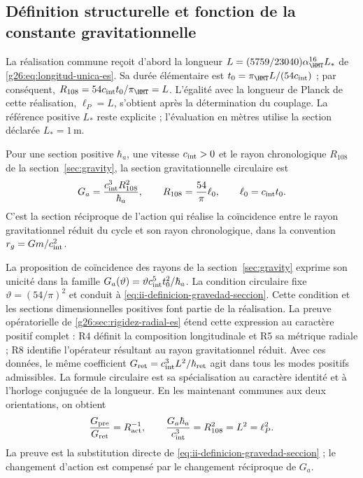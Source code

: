\subsection{Définition structurelle et fonction de la constante gravitationnelle}
\label{sec:ii-definicion-gravedad}

La réalisation commune reçoit d’abord la longueur
\(L=(5759/23040)\alpha_{\HMT}^{16}L_*\) de
\eqref{g26:eq:longitud-unica-es}. Sa durée élémentaire est
\(t_0=\pi_{\HMT}L/(54c_{\rm int})\) ; par conséquent,
\(R_{108}=54c_{\rm int}t_0/\pi_{\HMT}=L\).
L’égalité avec la longueur de Planck de cette réalisation,
\(\ell_P=L\), s’obtient après la détermination du couplage.
La référence positive \(L_*\) reste explicite ; l’évaluation
en mètres utilise la section déclarée \(L_*=1\,\mathrm m\).

\begin{definition}
Pour une section positive \(\hbar_a\), une vitesse
\(c_{\rm int}>0\) et le rayon chronologique \(R_{108}\) de la
section~\ref{sec:gravity}, la section gravitationnelle circulaire est
\begin{equation}
 G_a=\frac{c_{\rm int}^{3}R_{108}^{2}}{\hbar_a},
 \qquad R_{108}=\frac{54}{\pi}\ell_0,
 \qquad \ell_0=c_{\rm int}t_0.
 \label{eq:ii-definicion-gravedad-seccion}
\end{equation}
C'est la section réciproque de l'action qui réalise la coïncidence
entre le rayon gravitationnel réduit du cycle et son rayon
chronologique, dans la convention \(r_g=Gm/c_{\rm int}^2\).
\end{definition}

La proposition de coïncidence des rayons de la
section~\ref{sec:gravity} exprime son unicité dans la famille
\(G_a(\vartheta)=\vartheta c_{\rm int}^{5}t_0^2/\hbar_a\).
La condition circulaire fixe \(\vartheta=(54/\pi)^2\) et conduit
à \eqref{eq:ii-definicion-gravedad-seccion}. Cette condition et les
sections dimensionnelles positives font partie de la réalisation.
La preuve opératorielle de \ref{g26:sec:rigidez-radial-es} étend cette
expression au caractère positif complet : R4 définit la composition
longitudinale et R5 sa métrique radiale ; R8 identifie l’opérateur résultant
au rayon gravitationnel réduit. Avec ces données, le même coefficient
\(G_{\rm ret}=c_{\rm int}^3L^2/\hbar_{\rm ret}\) agit dans tous
les modes positifs admissibles. La formule circulaire est sa spécialisation
au caractère identité et à l’horloge conjuguée de la longueur.
En les maintenant communes aux deux orientations, on obtient
\begin{equation}
 \frac{G_{\mathrm{pre}}}{G_{\mathrm{ret}}}
 =R_{\mathrm{act}}^{-1},
 \qquad
 \frac{G_a\hbar_a}{c_{\rm int}^{3}}
 =R_{108}^{2}=L^2=\ell_P^2.
 \label{eq:ii-definicion-gravedad-area}
\end{equation}
La preuve est la substitution directe de
\eqref{eq:ii-definicion-gravedad-seccion} ; le changement d'action
est compensé par le changement réciproque de \(G_a\).

